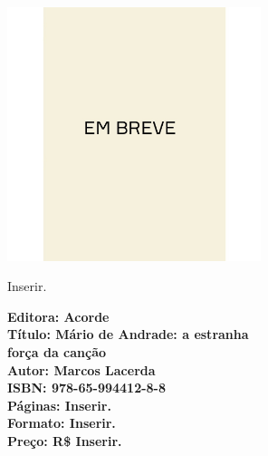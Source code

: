 \begin{center}
\hspace*{-3.6cm}
\hspace*{3.1cm}\includegraphics[width=74mm]{./CAPAS/breve.jpeg}
\end{center}
\hspace*{-7cm}\hrulefill\hspace*{-7cm}
\medskip

\noindent{}Inserir.

\vfill
\hspace*{-.4cm}\begin{minipage}[c]{.5\linewidth}
\small\textbf{
\hspace*{-.1cm}Editora: Acorde\\
Título: Mário de Andrade: a estranha\\força da canção\\
Autor: Marcos Lacerda\\ 
ISBN: 978-65-994412-8-8\\
Páginas: Inserir.\\
Formato: Inserir.\\
Preço: R\$ Inserir.\\
}
\end{minipage}




